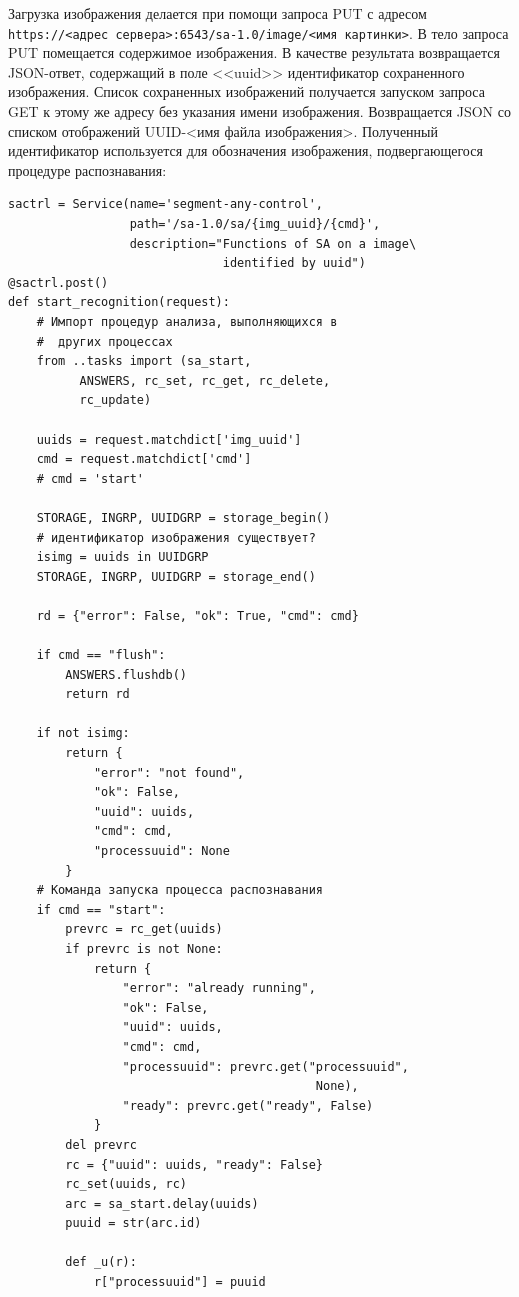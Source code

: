 \documentclass[732,fontsize=14pt,final]{studrep}
\begin{document}
Загрузка изображения делается при помощи запроса PUT с адресом \verb|https://<адрес сервера>:6543/sa-1.0/image/<имя картинки>|. В тело запроса PUT помещается содержимое изображения. В качестве результата возвращается JSON-ответ, содержащий в поле <<uuid>> идентификатор сохраненного изображения. Список сохраненных изображений получается запуском запроса GET к этому же адресу без указания имени изображения. Возвращается JSON со списком отображений UUID-<имя файла изображения>. Полученный идентификатор используется для обозначения изображения, подвергающегося процедуре распознавания:

\begin{verbatim}
sactrl = Service(name='segment-any-control',
                 path='/sa-1.0/sa/{img_uuid}/{cmd}',
                 description="Functions of SA on a image\
                              identified by uuid")
@sactrl.post()
def start_recognition(request):
    # Импорт процедур анализа, выполняющихся в
    #  других процессах
    from ..tasks import (sa_start,
          ANSWERS, rc_set, rc_get, rc_delete,
          rc_update)

    uuids = request.matchdict['img_uuid']
    cmd = request.matchdict['cmd']
    # cmd = 'start'

    STORAGE, INGRP, UUIDGRP = storage_begin()
    # идентификатор изображения существует?
    isimg = uuids in UUIDGRP
    STORAGE, INGRP, UUIDGRP = storage_end()

    rd = {"error": False, "ok": True, "cmd": cmd}

    if cmd == "flush":
        ANSWERS.flushdb()
        return rd

    if not isimg:
        return {
            "error": "not found",
            "ok": False,
            "uuid": uuids,
            "cmd": cmd,
            "processuuid": None
        }
    # Команда запуска процесса распознавания
    if cmd == "start":
        prevrc = rc_get(uuids)
        if prevrc is not None:
            return {
                "error": "already running",
                "ok": False,
                "uuid": uuids,
                "cmd": cmd,
                "processuuid": prevrc.get("processuuid",
                                           None),
                "ready": prevrc.get("ready", False)
            }
        del prevrc
        rc = {"uuid": uuids, "ready": False}
        rc_set(uuids, rc)
        arc = sa_start.delay(uuids)
        puuid = str(arc.id)

        def _u(r):
            r["processuuid"] = puuid


\end{verbatim}
\end{document}
